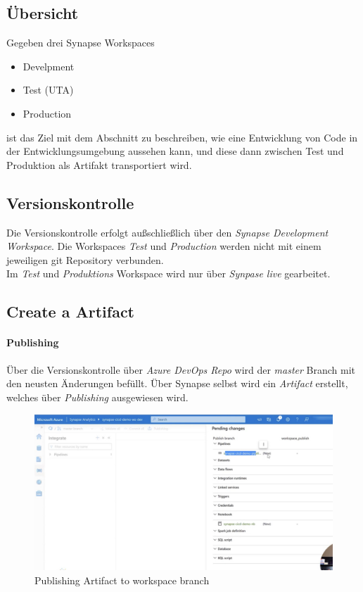\subsection{Übersicht}
Gegeben drei Synapse Workspaces
\begin{itemize}
	\item Develpment
	\item Test (UTA)
	\item Production
\end{itemize}
ist das Ziel mit dem Abschnitt zu beschreiben, wie eine Entwicklung von Code in der Entwicklungsumgebung aussehen kann, und diese dann zwischen Test und Produktion als Artifakt transportiert wird.\\

\subsection{Versionskontrolle}
Die Versionskontrolle erfolgt außschließlich über den \textit{Synapse Development Workspace}. Die Workspaces \textit{Test} und \textit{Production} werden nicht mit einem jeweiligen git Repository verbunden.\\

Im \textit{Test} und \textit{Produktions} Workspace wird nur über \textit{Synpase live} gearbeitet.

\subsection{Create a Artifact}
\paragraph{Publishing}
Über die Versionskontrolle über \textit{Azure DevOps Repo} wird der \textit{master} Branch mit den neusten Änderungen befüllt. Über Synapse selbst wird ein \textit{Artifact} erstellt, welches über \textit{Publishing} ausgewiesen wird.

\begin{figure}[H]
	\centering
	\includegraphics[scale = 0.2]{attachment/chapter_2/Scc151}
	\caption{Publishing Artifact to workspace branch} 
\end{figure}

